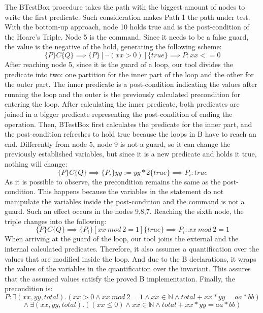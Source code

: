 \documentclass[runningheads]{llncs}
\begin{document}
The BTestBox procedure takes the path with the biggest amount of nodes to write the first predicate. Such consideration makes Path 1 the path under test. With the bottom-up approach, node 10 holds true and is the post-condition of the Hoare's Triple. Node 5 is the command. Since it needs to be a false guard, the value is the negative of the hold, generating the following scheme:
\nolinebreak[4]
\noindent
$$ {\displaystyle \{P\} C \{Q\} \implies \{P\} [\neg(xx > 0)] \{true\} \implies P: xx <= 0 } $$ 
\noindent \nolinebreak[4]
After reaching node 5, since it is the guard of a loop, our tool divides the predicate into two: one partition for the inner part of the loop and the other for the outer part. The inner predicate is a post-condition indicating the values after running the loop and the outer is the previously calculated precondition for entering the loop. After calculating the inner predicate, both predicates are joined in a bigger predicate representing the post-condition of ending the operation. Then, BTestBox first calculates the predicate for the inner part, and the post-condition refreshes to hold true because the loops in B have to reach an end. Differently from node 5, node 9 is not a guard, so it can change the previously established variables, but since it is a new predicate and holds it true, nothing will change: \nolinebreak[4]
\noindent $$ {\displaystyle \{P\} C \{Q\} \implies \{P_i\} yy := yy * 2\{true\} \implies P_i: true } $$ \nolinebreak[4]
\noindent
As it is possible to observe, the precondition remains the same as the post-condition. This happens because the variables in the statement do not manipulate the variables inside the post-condition and the command is not a guard. Such an effect occurs in the nodes 9,8,7. Reaching the sixth node, the triple changes into the following: \nolinebreak[4]
\noindent $$ {\displaystyle \{P\} C \{Q\} \implies \{P_i\} [xx\ mod\ 2=1]\{true\} \implies P_i: xx\ mod\ 2 = 1 }$$ \nolinebreak[4]
\noindent
When arriving at the guard of the loop, our tool joins the external and the internal calculated predicates. Therefore, it also assumes a quantification over the values that are modified inside the loop. And due to the B declarations, it wraps the values of the variables in the quantification over the invariant. This assures that the assumed values satisfy the proved B implementation. Finally, the precondition is: \nolinebreak[4]
\noindent
$${\displaystyle P: \exists(xx, yy, total).(xx > 0 \wedge xx\ mod\ 2 = 1 \wedge 
 xx \in \mathbb{N} \wedge total + xx * yy = aa * bb) }$$
$${\displaystyle \wedge \  \exists(xx, yy, total).((xx \leq 0) \wedge xx \in \mathbb{N} \wedge total + xx * yy = aa * bb)}$$
\end{document}
